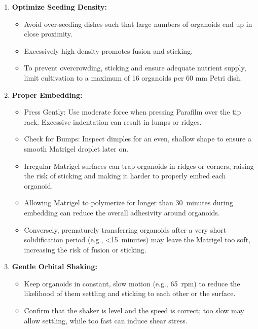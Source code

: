 \documentclass[11pt]{article}
\begin{document}
\begin{enumerate}[leftmargin=*]
    \item \textbf{Optimize Seeding Density:}
    \begin{itemize}[leftmargin=*]
        \item Avoid over-seeding dishes such that large numbers of organoids end up in close proximity.
        \item Excessively high density promotes fusion and sticking.
        \item To prevent overcrowding, sticking and ensure adequate nutrient supply, limit cultivation to a maximum of 16 organoids per 60 mm Petri dish.
    \end{itemize}

    \item \textbf{Proper Embedding:}
    \begin{itemize}[leftmargin=*]
        \item Press Gently: Use moderate force when pressing Parafilm over the tip rack. Excessive indentation can result in lumps or ridges.
        \item Check for Bumps: Inspect dimples for an even, shallow shape to ensure a smooth Matrigel droplet later on.
	    \item Irregular Matrigel surfaces can trap organoids in ridges or corners, raising the risk of sticking and making it harder to properly embed each organoid.
        \item Allowing Matrigel to polymerize for longer than 30~minutes during embedding can reduce the overall adhesivity around organoids.
        \item Conversely, prematurely transferring organoids after a very short solidification period (e.g., <15~minutes) may leave the Matrigel too soft, increasing the risk of fusion or sticking.
    \end{itemize}

    \item \textbf{Gentle Orbital Shaking:}
    \begin{itemize}[leftmargin=*]
        \item Keep organoids in constant, slow motion (e.g., 65~rpm) to reduce the likelihood of them settling and sticking to each other or the surface.
        \item Confirm that the shaker is level and the speed is correct; too slow may allow settling, while too fast can induce shear stress.
    \end{itemize}


\end{enumerate}
\end{document}
